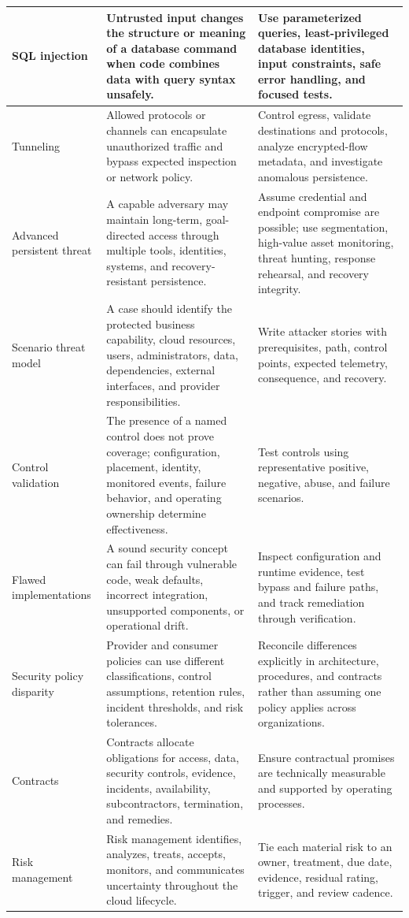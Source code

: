 \documentclass[11pt]{article}
\begin{document}
\begin{longtable}{@{}>{\RaggedRight\arraybackslash}p{}>{\RaggedRight\arraybackslash}p{}>{\RaggedRight\arraybackslash}p{}@{}}
SQL injection & Untrusted input changes the structure or meaning of a database command when code combines data with query syntax unsafely. & Use parameterized queries, least-privileged database identities, input constraints, safe error handling, and focused tests. \\\midrule
Tunneling & Allowed protocols or channels can encapsulate unauthorized traffic and bypass expected inspection or network policy. & Control egress, validate destinations and protocols, analyze encrypted-flow metadata, and investigate anomalous persistence. \\\midrule
Advanced persistent threat & A capable adversary may maintain long-term, goal-directed access through multiple tools, identities, systems, and recovery-resistant persistence. & Assume credential and endpoint compromise are possible; use segmentation, high-value asset monitoring, threat hunting, response rehearsal, and recovery integrity. \\\midrule
Scenario threat model & A case should identify the protected business capability, cloud resources, users, administrators, data, dependencies, external interfaces, and provider responsibilities. & Write attacker stories with prerequisites, path, control points, expected telemetry, consequence, and recovery. \\\midrule
Control validation & The presence of a named control does not prove coverage; configuration, placement, identity, monitored events, failure behavior, and operating ownership determine effectiveness. & Test controls using representative positive, negative, abuse, and failure scenarios. \\\midrule
Flawed implementations & A sound security concept can fail through vulnerable code, weak defaults, incorrect integration, unsupported components, or operational drift. & Inspect configuration and runtime evidence, test bypass and failure paths, and track remediation through verification. \\\midrule
Security policy disparity & Provider and consumer policies can use different classifications, control assumptions, retention rules, incident thresholds, and risk tolerances. & Reconcile differences explicitly in architecture, procedures, and contracts rather than assuming one policy applies across organizations. \\\midrule
Contracts & Contracts allocate obligations for access, data, security controls, evidence, incidents, availability, subcontractors, termination, and remedies. & Ensure contractual promises are technically measurable and supported by operating processes. \\\midrule
Risk management & Risk management identifies, analyzes, treats, accepts, monitors, and communicates uncertainty throughout the cloud lifecycle. & Tie each material risk to an owner, treatment, due date, evidence, residual rating, trigger, and review cadence. \\\midrule
\bottomrule
\end{longtable}
\endgroup
\end{document}
